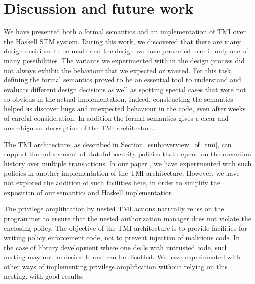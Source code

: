 \section{Discussion and future work}
\label{sec:conclusion}

We have presented both a formal semantics and an implementation of TMI over the
Haskell STM system. During this work, we discovered that there are many design
decisions to be made and the design we have presented here is only one of many
possibilities. The variants we experimented with in the design process did not
always exhibit the behaviour that we expected or wanted. For this task, defining
the formal semantics proved to be an essential tool to understand and evaluate
different design decisions as well as spotting special cases that were not so
obvious in the actual implementation. 
Indeed, constructing the semantics helped us discover bugs
and unexpected behaviour in the code, even after weeks of careful consideration.
In addition the formal semantics gives a clear and unambiguous
description of the TMI architecture.

%
%
%

The TMI architecture, as described in Section~\ref{ssub:overview_of_tmi}, 
can support the enforcement of stateful security policies that depend on the 
execution history over multiple transactions.  In our paper \cite{tmi}, we have experimented 
with such policies in another implementation of the TMI architecture.  
However, we have not explored the addition of such facilities here, 
in order to simplify the exposition of our semantics and Haskell implementation.

The privilege amplification by nested TMI actions naturally relies on the programmer
to ensure that the nested authorization manager does not violate the enclosing
policy. The objective of the TMI architecture is to provide facilities for writing
policy enforcement code, not to prevent injection of malicious code. In the case of library
development where one deals with untrusted code, such nesting may not be desirable and can
be disabled. We have experimented with other ways of implementing privilege amplification
without relying on this nesting, with good results.

